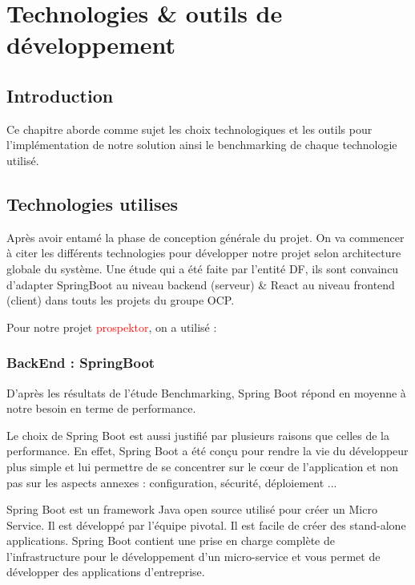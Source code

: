 \chapter{Technologies \& outils de d\'eveloppement}

\section{Introduction}

Ce chapitre aborde comme sujet les choix technologiques et les outils pour l'impl\'ementation de notre solution ainsi le benchmarking de chaque technologie utilis\'e.

\section{Technologies utilises}

Apr\`es avoir entam\'e la phase de conception g\'en\'erale du projet. On va commencer \`a citer  les diff\'erents technologies pour d\'evelopper notre projet selon architecture globale du syst\`eme. Une \'etude qui a \'et\'e faite par l'entit\'e \gls{DF}, ils sont convaincu d'adapter SpringBoot au niveau backend (serveur) \& React au niveau frontend (client) dans touts les projets du groupe \gls{OCP}.

Pour notre projet \textcolor{red}{prospektor}, on a utilis\'e :

\subsection{BackEnd : \textcolor{spring}{SpringBoot}}

D'apr\`es les r\'esultats de l'\'etude Benchmarking, Spring Boot r\'epond en moyenne \`a notre besoin en terme de performance.

Le choix de Spring Boot est aussi justifi\'e par plusieurs raisons que celles de la performance. En effet, Spring Boot a \'et\'e con\c{c}u pour rendre la vie du d\'eveloppeur plus simple et lui permettre de se concentrer sur le c\oe{}ur de l'application et non pas sur les aspects annexes : configuration, s\'ecurit\'e, d\'eploiement ...

Spring Boot est un framework Java open source utilis\'e pour cr\'eer un Micro Service. Il est d\'evelopp\'e par l'\'equipe pivotal. Il est facile de cr\'eer des stand-alone applications. Spring Boot contient une prise en charge compl\`ete de l'infrastructure pour le d\'eveloppement d'un micro-service et vous permet de d\'evelopper des applications d'entreprise.

